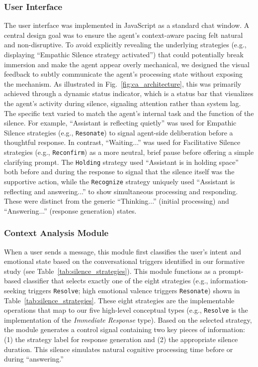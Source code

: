 \subsubsection{User Interface}
\begin{sloppypar}
The user interface was implemented in JavaScript as a standard chat window. 
A central design goal was to ensure the agent's context-aware pacing felt natural and non-disruptive. To avoid explicitly revealing the underlying strategies (e.g., displaying ``Empathic Silence strategy activated'') that could potentially break immersion and make the agent appear overly mechanical, we designed the visual feedback to subtly communicate the agent's processing state without exposing the mechanism. As illustrated in Fig.~\ref{fig:ca_architecture}, this was primarily achieved through a dynamic status indicator, which is a status bar that visualizes the agent's activity during silence, signaling attention rather than system lag. The specific text varied to match the agent's internal task and the function of the silence. For example, ``Assistant is reflecting quietly'' was used for Empathic Silence strategies (e.g., \texttt{Resonate}) to signal agent-side deliberation before a thoughtful response. In contrast, ``Waiting...'' was used for Facilitative Silence strategies (e.g., \texttt{Reconfirm}) as a more neutral, brief pause before offering a simple clarifying prompt. The \texttt{Holding} strategy used ``Assistant is in holding space'' both before and during the response to signal that the silence itself was the supportive action, while the \texttt{Recognize} strategy uniquely used ``Assistant is reflecting and answering...'' to show simultaneous processing and responding. These were distinct from the generic ``Thinking...'' (initial processing) and ``Answering...'' (response generation) states.\end{sloppypar}


\subsubsection{Context Analysis Module}
When a user sends a message, this module first classifies the user's intent and emotional state based on the conversational triggers identified in our formative study (see Table~\ref{tab:silence_strategies}).
This module functions as a prompt-based classifier that selects exactly one of the eight strategies (e.g., information-seeking triggers \texttt{Resolve}; high emotional valence triggers \texttt{Resonate}) shown in Table~\ref{tab:silence_strategies}. 
These eight strategies are the implementable operations that map to our five high-level conceptual types (e.g., \texttt{Resolve} is the implementation of the \emph{Immediate Response} type).
Based on the selected strategy, the module generates a control signal containing two key pieces of information: (1) the strategy label for response generation and (2) the appropriate silence duration. This silence simulates natural cognitive processing time before or during ``answering.''

